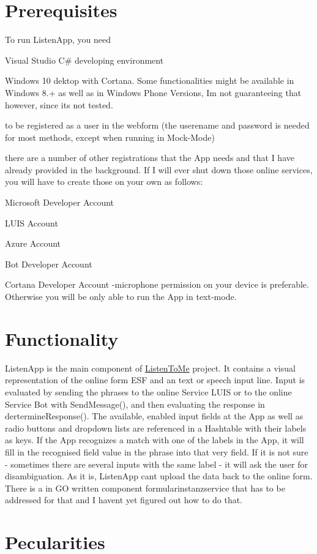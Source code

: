 \hypertarget{index_zero}{}\section{Prerequisites}\label{index_zero}
To run Listen\+App, you need
\begin{DoxyItemize}
\item Visual Studio C\# developing environment
\item Windows 10 dektop with Cortana. Some functionalities might be available in Windows 8.+ as well as in Windows Phone Versions, I\textquotesingle{}m not guaranteeing that however, since it\textquotesingle{}s not tested.
\item to be registered as a user in the webform (the userename and password is needed for most methods, except when running in Mock-\/\+Mode)
\item there are a number of other registrations that the App needs and that I have already provided in the background. If I will ever shut down those online services, you will have to create those on your own as follows\+:
\begin{DoxyEnumerate}
\item Microsoft Developer Account
\item L\+U\+IS Account
\item Azure Account
\item Bot Developer Account
\item Cortana Developer Account -\/microphone permission on your device is preferable. Otherwise you will be only able to run the App in text-\/mode.
\end{DoxyEnumerate}
\end{DoxyItemize}\hypertarget{index_first}{}\section{Functionality}\label{index_first}
Listen\+App is the main component of \mbox{\hyperlink{namespace_listen_to_me}{Listen\+To\+Me}} project. It contains a visual representation of the online form E\+SF and an text or speech input line. Input is evaluated by sending the phrases to the online Service L\+U\+IS or to the online Service Bot with Send\+Message(), and then evaluating the response in dertermine\+Response(). The available, enabled input fields at the App as well as radio buttons and dropdown lists are referenced in a Hashtable with their labels as keys. If the App recognizes a match with one of the labels in the App, it will fill in the recognised field value in the phrase into that very field. If it is not sure -\/ sometimes there are several inputs with the same label -\/ it will ask the user for disambiguation. As it is, Listen\+App can\textquotesingle{}t upload the data back to the online form. There is a in GO written component formularinstanzservice that has to be addressed for that and I haven\textquotesingle{}t yet figured out how to do that.\hypertarget{index_second}{}\section{Pecularities}\label{index_second}
